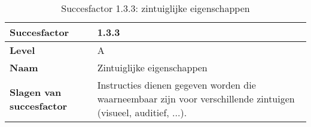 \begin{table}
    \centering
    \caption{Succesfactor 1.3.3: zintuiglijke eigenschappen }
     \hspace*{-1cm}\begin{tabular}{|l|p{12cm}|} 
        \hline
        \textbf{Succesfactor}                 & 1.3.3                                                                                                                                                                                                                                                                                                                                                                                                                                                                                                             \\ 
        \hline
        \textbf{Level}                        & A                                                                                                                                                                                                                                                                                                                                                                                                                                                                                                                 \\ 
        \hline
        \textbf{Naam}                         & Zintuiglijke eigenschappen~~                                                                                                                                                                                                                                                                                                                                                                                                                                                                                      \\ 
        \hline
        \textbf{Slagen van succesfactor}      & Instructies dienen gegeven worden die waarneembaar zijn voor verschillende zintuigen (visueel, auditief, ...).                                                                                                                                                                                                                                                                                                                                                                                                                    \\ 

\end{tabular}
\end{table}
